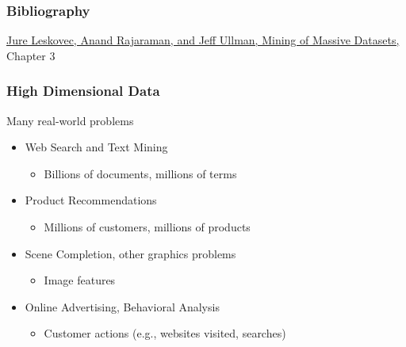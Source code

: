 \documentclass[svgnames]{beamer}
\subtitle{Efficient Similarity Search}
\begin{document}
\maketitle
\makeoutline

\begin{frame}
    \frametitle{Bibliography}
    \href{http://www.mmds.org}{Jure Leskovec, Anand Rajaraman, and Jeff Ullman, Mining of Massive Datasets,} Chapter 3
\end{frame}

\begin{frame} \frametitle{High Dimensional Data}
\begin{block}{Many real-world problems}
\begin{itemize}
\item Web Search and Text Mining
  \begin{itemize}
  \item Billions of documents, millions of terms
  \end{itemize}
\item Product Recommendations
  \begin{itemize}
  \item Millions of customers, millions of products
  \end{itemize}
\item Scene Completion, other graphics problems
  \begin{itemize}
  \item Image features
  \end{itemize}
\item Online Advertising, Behavioral Analysis
  \begin{itemize}
  \item Customer actions (e.g., websites visited, searches)
  \end{itemize}
\end{itemize}
\end{block}
\end{frame}

  
\end{document}
